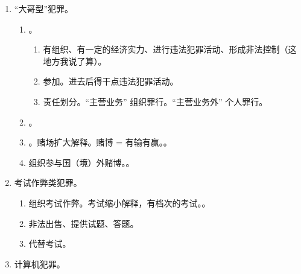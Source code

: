 \begin{enumerate}
\begin{enumerate}
                \begin{enumerate}
                  \item 高度要求。\yi 只要  层楼，3m 左右。\er 存在垂直位移。。
                  \item 故意。vs 高空坠物（过失）。
                  \item 引起其他罪，想象竞合。。
                \end{enumerate}
          \item 投放虚假危险物质。
          \item 催收非法债务。
          \item {}。。
        \end{enumerate}
  \item “大哥型”犯罪。
        \begin{enumerate}
          \item {}。
                \begin{enumerate}
                  \item 有组织、有一定的经济实力、进行违法犯罪活动、形成非法控制（这地方我说了算）。
                  \item 参加。进去后得干点违法犯罪活动。
                  \item 责任划分。“主营业务” \yjt 组织罪行。“主营业务外” \yjt 个人罪行。
                \end{enumerate}
          \item {}。
          \item {}。赌场扩大解释。赌博 = 有输有赢。。
          \item 组织参与国（境）外赌博。。
        \end{enumerate}
  \item 考试作弊类犯罪。
        \begin{enumerate}
          \item 组织考试作弊。考试缩小解释，有档次的考试。。
          \item 非法出售、提供试题、答题。
          \item 代替考试。
        \end{enumerate}
  \item 计算机犯罪。
        \begin{enumerate}

\end{enumerate}
\end{enumerate}

